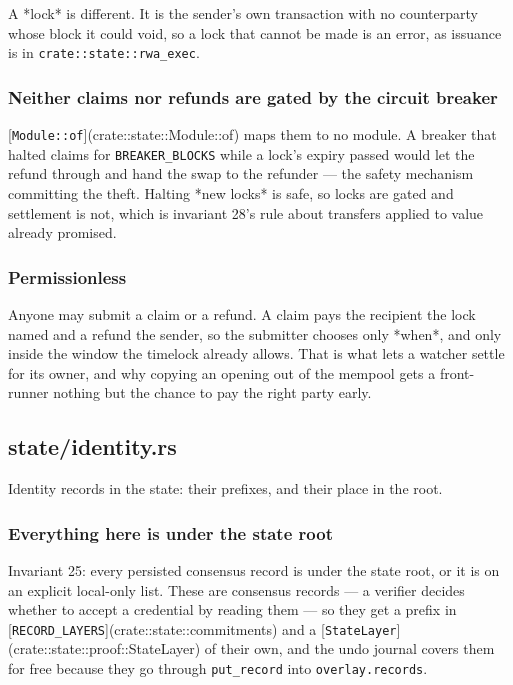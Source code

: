 \documentclass[11pt,a4paper]{article}
\begin{document}
A *lock* is different. It is the sender's own transaction with no
counterparty whose block it could void, so a lock that cannot be made is an
error, as issuance is in \texttt{crate::state::rwa\_exec}.

\subsubsection{Neither claims nor refunds are gated by the circuit breaker}

[\texttt{Module::of}](crate::state::Module::of) maps them to no module. A breaker
that halted claims for \texttt{BREAKER\_BLOCKS} while a lock's expiry passed would
let the refund through and hand the swap to the refunder — the safety
mechanism committing the theft. Halting *new locks* is safe, so locks are
gated and settlement is not, which is invariant 28's rule about transfers
applied to value already promised.

\subsubsection{Permissionless}

Anyone may submit a claim or a refund. A claim pays the recipient the lock
named and a refund the sender, so the submitter chooses only *when*, and
only inside the window the timelock already allows. That is what lets a
watcher settle for its owner, and why copying an opening out of the mempool
gets a front-runner nothing but the chance to pay the right party early.

\subsection{state/identity.rs}
Identity records in the state: their prefixes, and their place in the root.

\subsubsection{Everything here is under the state root}

Invariant 25: every persisted consensus record is under the state root, or
it is on an explicit local-only list. These are consensus records — a
verifier decides whether to accept a credential by reading them — so they
get a prefix in [\texttt{RECORD\_LAYERS}](crate::state::commitments) and a
[\texttt{StateLayer}](crate::state::proof::StateLayer) of their own, and the undo
journal covers them for free
because they go through \texttt{put\_record} into \texttt{overlay.records}.
\end{document}
